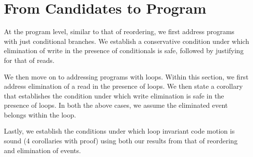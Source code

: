 \section{From Candidates to Program}

    At the program level, similar to that of reordering, we first address programs with just conditional branches.
    We establish a conservative condition under which elimination of write in the presence of conditionals is safe, followed by justifying for that of reads.

    We then move on to addressing programs with loops.
    Within this section, we first address elimination of a read in the presence of loops.
    We then state a corollary that establishes the condition under which write elimination is safe in the presence of loops.
    In both the above cases, we assume the eliminated event belongs within the loop.

    Lastly, we establish the conditions under which loop invariant code motion is sound (4 corollaries with proof) using both our results from that of reordering and elimination of events.

    

    